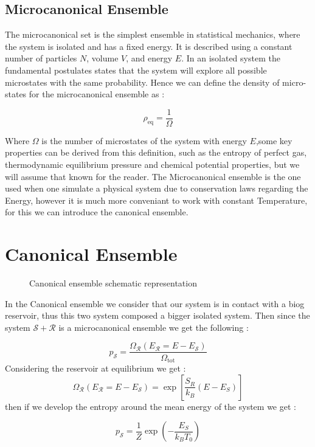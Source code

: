 \documentclass[ansiapaper]{report}
\begin{document}
\begin{multicols}{3}
    \subsection{Microcanonical Ensemble}
    The microcanonical set is the simplest ensemble in statistical mechanics, where the system is isolated and has a fixed energy. It is described using a constant number of particles $N$, volume $V$, and energy $E$. In an isolated system the fundamental postulates states that the system will explore all possible microstates with the same probability. Hence we can define the density of micro-states for the microcanonical ensemble as :

 $$ \rho_{\text{eq}} = \frac{1}{\Omega} $$

Where $ \Omega $ is the number of microstates of the system with energy $E$,some key properties can be derived from this definition, such as the entropy of perfect gas, thermodynamic equilibrium pressure and chemical potential properties, but we will assume that known for the reader. The Microcanonical ensemble is the one used when one simulate a physical system due to conservation laws regarding the Energy, however it is much more conveniant to work with constant Temperature, for this we can introduce the canonical ensemble. 

\section{Canonical Ensemble}

\begin{figure}[H]
		\def\svgwidth{\linewidth}
		
        \caption{Canonical ensemble schematic representation}
        \vspace{0.15cm}
\end{figure}

In the Canonical ensemble we consider that our system is in contact with a biog reservoir, thus this two system composed a bigger isolated system. Then since the system $\mathcal{S} + \mathcal{R}$ is a microcanonical ensemble we get the following : 

$$ p_\mathcal{S} = \frac{\Omega_\mathcal{R}(E_\mathcal{R} =  E - E_\mathcal{S})}{\Omega_{\text{tot}}}$$
Considering the reservoir at equilibrium we get : 
$$\Omega_\mathcal{R}(E_\mathcal{R} =  E - E_\mathcal{S}) = \exp \left[ \frac{S_R}{k_B}(E - E_S)\right] $$
then if we develop the entropy around the mean energy of the system we get : 

$$ p_\mathcal{S} = \frac{1}{Z}\exp \left( - \frac{E_S}{k_B T_0}\right)$$


\end{multicols}
\end{document}
